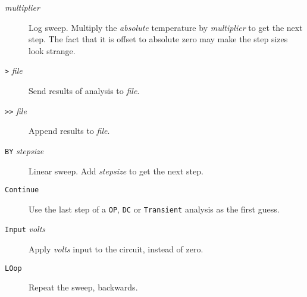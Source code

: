 \begin{description}

\item[{\tt *} {\it multiplier}] Log sweep.  Multiply the
{\em absolute} temperature by {\it multiplier} to get the
next step.  The fact that it is offset to absolute zero
may make the step sizes look strange.

\item[{\tt >} {\it file}] Send results of analysis to {\it file}.

\item[{\tt >>} {\it file}] Append results to {\it file}.



\item[{\tt BY} {\it stepsize}] Linear sweep.  Add {\it
stepsize} to get the next step.

\item[{\tt Continue}] Use the last step of a {\tt OP},
{\tt DC} or {\tt Transient} analysis as the first guess.



\item[{\tt Input} {\it volts}] Apply {\it volts} input to
the circuit, instead of zero.



\item[{\tt LOop}] Repeat the sweep, backwards.




\end{description}
